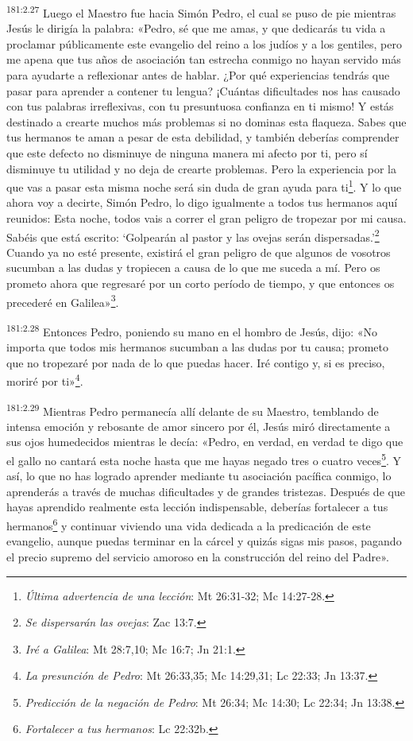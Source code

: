 \par
\textsuperscript{181:2.27} Luego el Maestro fue hacia Simón Pedro, el cual se puso de pie mientras Jesús le dirigía la palabra: «Pedro, sé que me amas, y que dedicarás tu vida a proclamar públicamente este evangelio del reino a los judíos y a los gentiles, pero me apena que tus años de asociación tan estrecha conmigo no hayan servido más para ayudarte a reflexionar antes de hablar. ¿Por qué experiencias tendrás que pasar para aprender a contener tu lengua? ¡Cuántas dificultades nos has causado con tus palabras irreflexivas, con tu presuntuosa confianza en ti mismo! Y estás destinado a crearte muchos más problemas si no dominas esta flaqueza. Sabes que tus hermanos te aman a pesar de esta debilidad, y también deberías comprender que este defecto no disminuye de ninguna manera mi afecto por ti, pero sí disminuye tu utilidad y no deja de crearte problemas. Pero la experiencia por la que vas a pasar esta misma noche será sin duda de gran ayuda para ti\footnote{\textit{Última advertencia de una lección}: Mt 26:31-32; Mc 14:27-28.}. Y lo que ahora voy a decirte, Simón Pedro, lo digo igualmente a todos tus hermanos aquí reunidos: Esta noche, todos vais a correr el gran peligro de tropezar por mi causa. Sabéis que está escrito: `Golpearán al pastor y las ovejas serán dispersadas.'\footnote{\textit{Se dispersarán las ovejas}: Zac 13:7.} Cuando ya no esté presente, existirá el gran peligro de que algunos de vosotros sucumban a las dudas y tropiecen a causa de lo que me suceda a mí. Pero os prometo ahora que regresaré por un corto período de tiempo, y que entonces os precederé en Galilea»\footnote{\textit{Iré a Galilea}: Mt 28:7,10; Mc 16:7; Jn 21:1.}.

\par
\textsuperscript{181:2.28} Entonces Pedro, poniendo su mano en el hombro de Jesús, dijo: «No importa que todos mis hermanos sucumban a las dudas por tu causa; prometo que no tropezaré por nada de lo que puedas hacer. Iré contigo y, si es preciso, moriré por ti»\footnote{\textit{La presunción de Pedro}: Mt 26:33,35; Mc 14:29,31; Lc 22:33; Jn 13:37.}.

\par
\textsuperscript{181:2.29} Mientras Pedro permanecía allí delante de su Maestro, temblando de intensa emoción y rebosante de amor sincero por él, Jesús miró directamente a sus ojos humedecidos mientras le decía: «Pedro, en verdad, en verdad te digo que el gallo no cantará esta noche hasta que me hayas negado tres o cuatro veces\footnote{\textit{Predicción de la negación de Pedro}: Mt 26:34; Mc 14:30; Lc 22:34; Jn 13:38.}. Y así, lo que no has logrado aprender mediante tu asociación pacífica conmigo, lo aprenderás a través de muchas dificultades y de grandes tristezas. Después de que hayas aprendido realmente esta lección indispensable, deberías fortalecer a tus hermanos\footnote{\textit{Fortalecer a tus hermanos}: Lc 22:32b.} y continuar viviendo una vida dedicada a la predicación de este evangelio, aunque puedas terminar en la cárcel y quizás sigas mis pasos, pagando el precio supremo del servicio amoroso en la construcción del reino del Padre».

